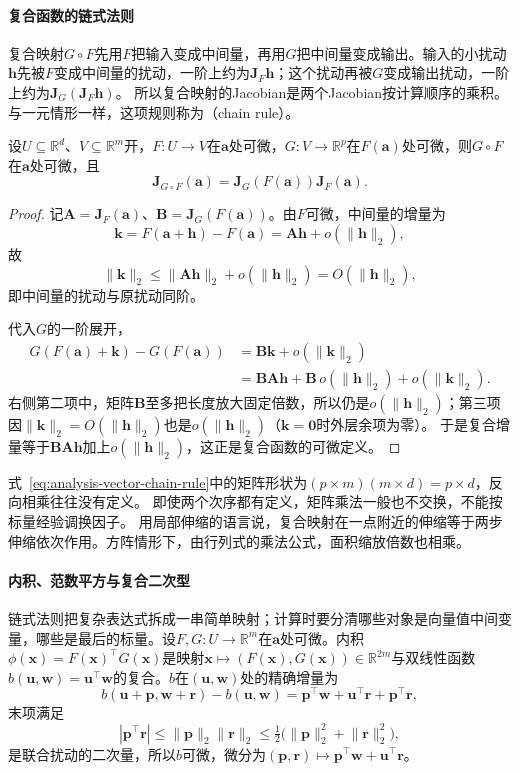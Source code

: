 \paragraph{复合函数的链式法则}
复合映射$G\circ F$先用$F$把输入变成中间量，再用$G$把中间量变成输出。输入的小扰动$\bm h$先被$F$变成中间量的扰动，一阶上约为$\bm J_F\bm h$；这个扰动再被$G$变成输出扰动，一阶上约为$\bm J_G(\bm J_F\bm h)$。
所以复合映射的Jacobian是两个Jacobian按计算顺序的乘积。与一元情形一样，这项规则称为（chain rule）。
\begin{theorem}[向量值函数的链式法则]
\label{thm:multivariable-vector-chain-rule}
设$U\subseteq\mathbb R^d$、$V\subseteq\mathbb R^m$开，$F:U\to V$在$\bm a$处可微，$G:V\to\mathbb R^p$在$F(\bm a)$处可微，则$G\circ F$在$\bm a$处可微，且
\begin{equation}
 \bm J_{G\circ F}(\bm a)=\bm J_G(F(\bm a))\bm J_F(\bm a).
\label{eq:analysis-vector-chain-rule}
\end{equation}
\end{theorem}
\begin{proof}
记$\bm A=\bm J_F(\bm a)$、$\bm B=\bm J_G(F(\bm a))$。由$F$可微，中间量的增量为
\[
 \bm k=F(\bm a+\bm h)-F(\bm a)=\bm A\bm h+o(\lVert\bm h\rVert_2),
\]
故
\[
 \lVert\bm k\rVert_2\leq\lVert\bm A\bm h\rVert_2+o(\lVert\bm h\rVert_2)=O(\lVert\bm h\rVert_2),
\]
即中间量的扰动与原扰动同阶。

代入$G$的一阶展开，
\[
 \begin{aligned}
 G(F(\bm a)+\bm k)-G(F(\bm a))
 &=\bm B\bm k+o(\lVert\bm k\rVert_2)\\
 &=\bm B\bm A\bm h+\bm B\,o(\lVert\bm h\rVert_2)+o(\lVert\bm k\rVert_2).
 \end{aligned}
\]
右侧第二项中，矩阵$\bm B$至多把长度放大固定倍数，所以仍是$o(\lVert\bm h\rVert_2)$；第三项因$\lVert\bm k\rVert_2=O(\lVert\bm h\rVert_2)$也是$o(\lVert\bm h\rVert_2)$（$\bm k=\bm0$时外层余项为零）。
于是复合增量等于$\bm B\bm A\bm h$加上$o(\lVert\bm h\rVert_2)$，这正是复合函数的可微定义。
\end{proof}
式~\eqref{eq:analysis-vector-chain-rule}中的矩阵形状为$(p\times m)(m\times d)=p\times d$，反向相乘往往没有定义。
即使两个次序都有定义，矩阵乘法一般也不交换，不能按标量经验调换因子。
用局部伸缩的语言说，复合映射在一点附近的伸缩等于两步伸缩依次作用。方阵情形下，由行列式的乘法公式，面积缩放倍数也相乘。

\paragraph{内积、范数平方与复合二次型}
链式法则把复杂表达式拆成一串简单映射；计算时要分清哪些对象是向量值中间变量，哪些是最后的标量。设$F,G:U\to\mathbb R^m$在$\bm a$处可微。内积$\phi(\bm x)=F(\bm x)^\top G(\bm x)$是映射$\bm x\mapsto(F(\bm x),G(\bm x))\in\mathbb R^{2m}$与双线性函数$b(\bm u,\bm w)=\bm u^\top\bm w$的复合。$b$在$(\bm u,\bm w)$处的精确增量为
\[
 b(\bm u+\bm p,\bm w+\bm r)-b(\bm u,\bm w)=\bm p^\top\bm w+\bm u^\top\bm r+\bm p^\top\bm r,
\]
末项满足
\[
 |\bm p^\top\bm r|\leq\lVert\bm p\rVert_2\lVert\bm r\rVert_2\leq\tfrac12\bigl(\lVert\bm p\rVert_2^2+\lVert\bm r\rVert_2^2\bigr),
\]
是联合扰动的二次量，所以$b$可微，微分为$(\bm p,\bm r)\mapsto\bm p^\top\bm w+\bm u^\top\bm r$。


